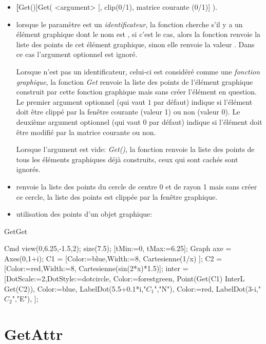 \begin{itemize}
 \item \util \textbf[Get()]{Get( <argument> [, clip(0/1), matrice courante (0/1)] )}.
 \item \desc  lorsque le paramètre  est un \textit{identificateur}, la fonction cherche s'il y a un élément graphique dont le nom est , si c'est le cas, alors la fonction renvoie la liste des points de cet élément graphique, sinon elle renvoie la valeur \Nil. Dans ce cas l'argument optionnel est ignoré.

 Lorsque  n'est pas un identificateur, celui-ci est considéré comme une \textit{fonction graphique}, la fonction \textsl{Get} renvoie la liste des points de l'élément graphique construit par cette fonction graphique mais sans créer l'élément en question. Le premier argument optionnel  (qui vaut $1$ par défaut) indique si l'élément doit être clippé par la fenêtre courante (valeur 1) ou non (valeur 0). Le deuxième argument optionnel  (qui vaut $0$ par défaut) indique si l'élément doit être modifié par la matrice courante ou non.
 
 Lorsque l'argument est vide: \textsl{Get()}, la fonction renvoie la liste des points de tous les éléments graphiques déjà construits, ceux qui sont cachés sont ignorés.
 \item \exem {} renvoie la liste des points du cercle de centre 0 et de rayon 1 mais sans créer ce cercle, la liste des points est clippée par la fenêtre graphique.
 \item \exem utilisation des points d'un objet graphique:
\end{itemize}

\begin{demo}{Get}{Get}
\begin{texgraph}[name=Get,file]
Cmd view(0,6.25,-1.5,2);
  size(7.5);
  [tMin:=0, tMax:=6.25];
Graph axe = Axes(0,1+i);
   C1 = [Color:=blue,Width:=8,
      Cartesienne(1/x) ];
   C2 = [Color:=red,Width:=8,
      Cartesienne(sin(2*x)*1.5)];
   inter = [DotScale:=2,DotStyle:=dotcircle,
        Color:=forestgreen,
        Point(Get(C1) InterL Get(C2)),
        Color:=blue,
        LabelDot(5.5+0.1*i,"$C_1$","N"),
        Color:=red,
        LabelDot(3-i,"$C_2$","E"),
       ];
\end{texgraph}
\end{demo}


\section{GetAttr}\label{cmdGetAttr}

